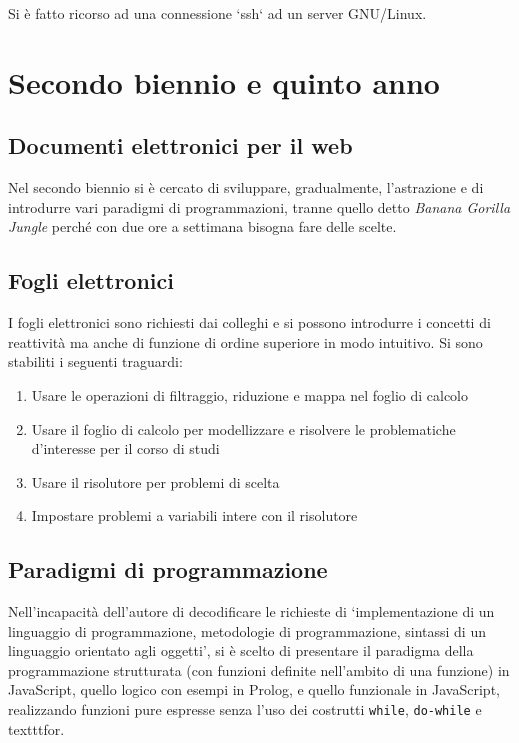 \documentclass[a4paper]{easychair}
\begin{document}
Si è fatto ricorso ad una connessione `ssh` ad un server GNU/Linux.

\section{Secondo biennio e quinto anno}

\subsection[Web]{Documenti elettronici per il web}

Nel secondo biennio si è cercato di sviluppare, gradualmente, l'astrazione
e di introdurre vari paradigmi di programmazioni, tranne quello detto
\textit{Banana Gorilla Jungle} perché con due ore a settimana bisogna
fare delle scelte.
 
\subsection[Fogli elettronici]{Fogli elettronici}

I fogli elettronici sono richiesti dai colleghi e si possono
introdurre i concetti di reattività ma anche di funzione di
ordine superiore in modo intuitivo. Si sono stabiliti i seguenti
traguardi:

\begin{enumerate}
  \item
    Usare le operazioni di filtraggio, riduzione e mappa nel foglio di
    calcolo
  \item
    Usare il foglio di calcolo per modellizzare e risolvere le
    problematiche d'interesse per il corso di studi
  \item
    Usare il risolutore per problemi di scelta
  \item
    Impostare problemi a variabili intere con il risolutore
\end{enumerate}

\subsection[Paradigmi]{Paradigmi di programmazione}

Nell'incapacità dell'autore di decodificare le richieste
di `implementazione di un linguaggio di programmazione,
metodologie di programmazione, sintassi di un linguaggio
orientato agli oggetti', si è scelto di presentare il paradigma
della programmazione strutturata (con funzioni definite nell'ambito 
di una funzione) in JavaScript, quello logico con esempi in Prolog,
e quello funzionale in JavaScript, realizzando funzioni pure espresse
senza l'uso dei costrutti \texttt{while}, \texttt{do-while} e texttt{for}.
\end{document}
